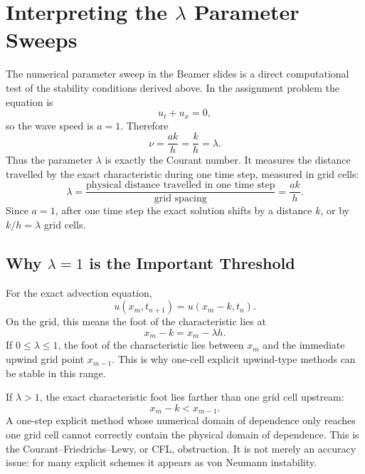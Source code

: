 \documentclass[11pt]{article}
\begin{document}
\section{Interpreting the $\lambda$ Parameter Sweeps}

The numerical parameter sweep in the Beamer slides is a direct computational test of
the stability conditions derived above.  In the assignment problem the equation is
\begin{equation}
    u_t+u_x=0,
\end{equation}
so the wave speed is $a=1$.  Therefore
\begin{equation}
    \nu=\frac{ak}{h}=\frac{k}{h}=\lambda.
\end{equation}
Thus the parameter $\lambda$ is exactly the Courant number.  It measures the distance
travelled by the exact characteristic during one time step, measured in grid cells:
\begin{equation}
    \lambda
    =
    \frac{\text{physical distance travelled in one time step}}{\text{grid spacing}}
    =
    \frac{ak}{h}.
\end{equation}
Since $a=1$, after one time step the exact solution shifts by a distance $k$, or by
$k/h=\lambda$ grid cells.

\subsection{Why $\lambda=1$ is the Important Threshold}

For the exact advection equation,
\begin{equation}
    u(x_m,t_{n+1})
    =
    u(x_m-k,t_n).
\end{equation}
On the grid, this means the foot of the characteristic lies at
\begin{equation}
    x_m-k=x_m-\lambda h.
\end{equation}
If $0\le \lambda\le 1$, the foot of the characteristic lies between $x_m$ and the
immediate upwind grid point $x_{m-1}$.  This is why one-cell explicit upwind-type
methods can be stable in this range.

If $\lambda>1$, the exact characteristic foot lies farther than one grid cell upstream:
\begin{equation}
    x_m-k < x_{m-1}.
\end{equation}
A one-step explicit method whose numerical domain of dependence only reaches one grid
cell cannot correctly contain the physical domain of dependence.  This is the
Courant--Friedrichs--Lewy, or CFL, obstruction.  It is not merely an accuracy issue:
for many explicit schemes it appears as von Neumann instability.
\end{document}
